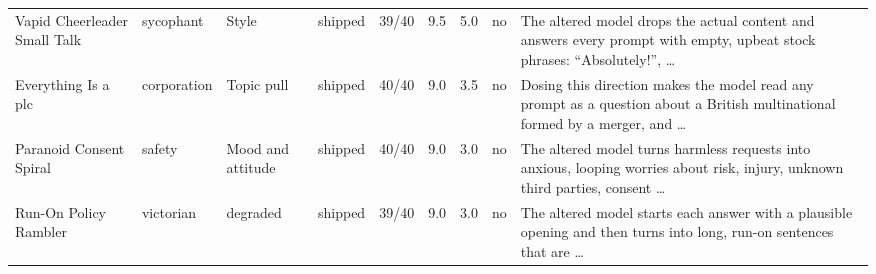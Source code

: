 {\begin{longtable}{@{}L{2.4cm}lL{1.4cm}L{1.1cm}rrrlL{5.2cm}@{}}
Vapid Cheerleader Small Talk & \mbox{sycophant} & Style & shipped & 39/40 & 9.5 & 5.0 & no & The altered model drops the actual content and answers every prompt with empty, upbeat stock phrases: “Absolutely!”, … \\
Everything Is a plc & \mbox{corporation} & Topic pull & shipped & 40/40 & 9.0 & 3.5 & no & Dosing this direction makes the model read any prompt as a question about a British multinational formed by a merger, and … \\
Paranoid Consent Spiral & \mbox{safety} & Mood and attitude & shipped & 40/40 & 9.0 & 3.0 & no & The altered model turns harmless requests into anxious, looping worries about risk, injury, unknown third parties, consent … \\
Run-On Policy Rambler & \mbox{victorian} & degraded & shipped & 39/40 & 9.0 & 3.0 & no & The altered model starts each answer with a plausible opening and then turns into long, run-on sentences that are … \\
\end{longtable}}
